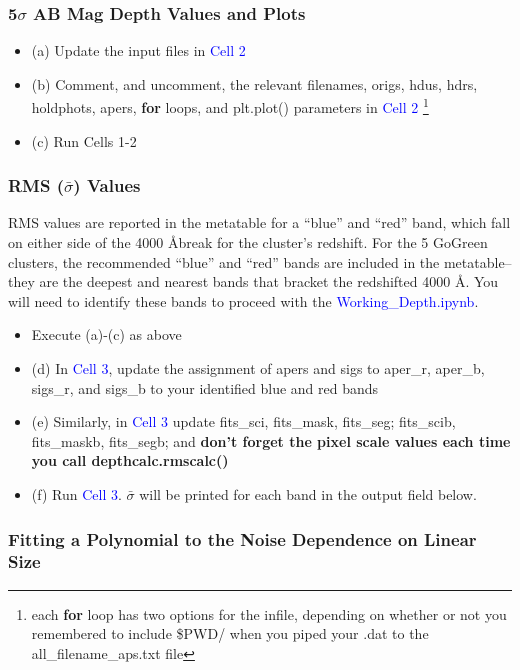 \documentclass[a4paper,10pt]{article}
\begin{document}
\subsubsection{5$\sigma$ AB Mag Depth Values and Plots}
\begin{itemize}
    \setlength{\itemsep}{-5pt}
 \item (a) Update the input files in \textcolor{blue}{Cell 2}
 \item (b) Comment, and uncomment, the relevant filenames, origs, hdus, hdrs, holdphots, apers, \textbf{for} loops, and plt.plot() parameters in \textcolor{blue}{Cell 2} \footnote{each \textbf{for} loop has two options for the infile, depending on whether or not you remembered to include \$PWD/ when you piped your .dat to the all\_filename\_aps.txt file}
 \item (c) Run Cells 1-2
\end{itemize}

\subsubsection{RMS ($\bar{\sigma}$) Values}

RMS values are reported in the metatable for a ``blue'' and ``red'' band, which fall on either side of the 4000 \AA  break for the cluster's redshift. For the 5 GoGreen clusters, the recommended ``blue'' and ``red'' bands are included in the metatable--they are the deepest and nearest bands that bracket the redshifted 4000 \AA. You will need to identify these bands to proceed with the \textcolor{blue}{Working\_Depth.ipynb}.

\begin{itemize}
 \item Execute (a)-(c) as above
 \item (d) In \textcolor{blue}{Cell 3}, update the assignment of apers and sigs to aper\_r, aper\_b, sigs\_r, and sigs\_b to your identified blue and red bands
 \item (e) Similarly, in \textcolor{blue}{Cell 3} update fits\_sci, fits\_mask, fits\_seg; fits\_scib, fits\_maskb, fits\_segb; and \textbf{don't forget the pixel scale values each time you call depthcalc.rmscalc()}
 \item (f) Run \textcolor{blue}{Cell 3}. $\bar{\sigma}$ will be printed for each band in the output field below.
\end{itemize}

\subsubsection{Fitting a Polynomial to the Noise Dependence on Linear Size}
\end{document}
